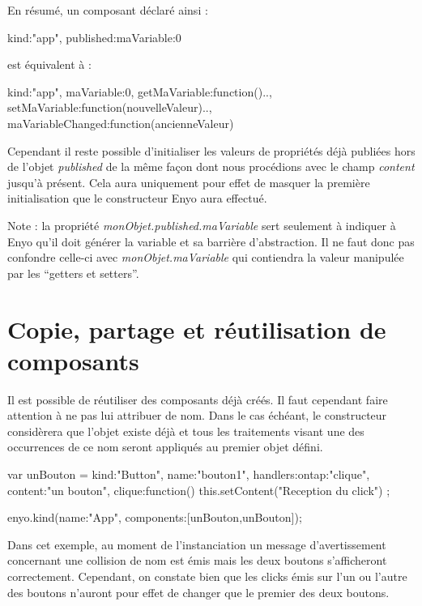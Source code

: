 \documentclass[11pt,a4paper]{report}
\begin{document}
En résumé, un composant déclaré ainsi : 
\begin{JavaScript}
  {kind:"app", published:{maVariable:0}}
\end{JavaScript}
est équivalent à :
\begin{JavaScript}
  {kind:"app", maVariable:0, 
    getMaVariable:function(){..}, 
    setMaVariable:function(nouvelleValeur){..}, 
    maVariableChanged:function(ancienneValeur){}}
\end{JavaScript}


Cependant il reste possible d'initialiser les valeurs de propriétés 
déjà publiées hors de l'objet \emph{published} de la même façon dont nous procédions 
avec le champ \emph{content} jusqu'à présent. Cela aura uniquement pour effet de  masquer la première 
initialisation que le constructeur Enyo aura effectué.

Note : la propriété \emph{monObjet.published.maVariable} sert seulement à indiquer à Enyo 
qu'il doit générer la variable et sa barrière d'abstraction.
Il ne faut donc pas confondre celle-ci avec \emph{monObjet.maVariable} qui contiendra
la valeur manipulée par les ``getters et setters''.

\section{Copie, partage et réutilisation de composants}

Il est possible de réutiliser des composants déjà créés. Il faut cependant faire attention à ne pas
lui attribuer de nom. Dans le cas échéant, le constructeur considèrera que l'objet existe déjà et 
tous les traitements visant une des occurrences de ce nom seront appliqués au premier objet défini.

\begin{JavaScript}
var unBouton = {kind:"Button", name:"bouton1", 
                handlers:{ontap:"clique"}, 
                content:"un bouton",
                clique:function(){
                  this.setContent("Reception du click")
                }
};

enyo.kind({name:"App", components:[unBouton,unBouton]});
\end{JavaScript}

Dans cet exemple, au moment de l'instanciation un message d'avertissement concernant une collision de nom 
est émis mais les deux boutons s'afficheront correctement. Cependant, on constate bien que les clicks 
émis sur l'un ou l'autre des boutons n'auront pour effet de changer que le premier des deux boutons.\\\medskip
\end{document}
